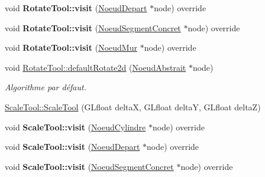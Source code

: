 \begin{DoxyCompactItemize}
\item 
\hypertarget{group__inf2990_ga9649bf652069731e900bb850bd3f8475}{}void {\bfseries Rotate\+Tool\+::visit} (\hyperlink{class_noeud_depart}{Noeud\+Depart} $\ast$node) override\label{group__inf2990_ga9649bf652069731e900bb850bd3f8475}

\item 
\hypertarget{group__inf2990_ga6a6b02897bd7b72119e7a4463d408d47}{}void {\bfseries Rotate\+Tool\+::visit} (\hyperlink{class_noeud_segment_concret}{Noeud\+Segment\+Concret} $\ast$node) override\label{group__inf2990_ga6a6b02897bd7b72119e7a4463d408d47}

\item 
\hypertarget{group__inf2990_gaa3542aa6a6a3f763a133b4003d30c41f}{}void {\bfseries Rotate\+Tool\+::visit} (\hyperlink{class_noeud_mur}{Noeud\+Mur} $\ast$node) override\label{group__inf2990_gaa3542aa6a6a3f763a133b4003d30c41f}

\item 
\hypertarget{group__inf2990_ga3d7a6452fd82b9684e5e24ed3aeef6b5}{}void \hyperlink{group__inf2990_ga3d7a6452fd82b9684e5e24ed3aeef6b5}{Rotate\+Tool\+::default\+Rotate2d} (\hyperlink{class_noeud_abstrait}{Noeud\+Abstrait} $\ast$node)\label{group__inf2990_ga3d7a6452fd82b9684e5e24ed3aeef6b5}

\begin{DoxyCompactList}\small\item\em Algorithme par défaut. \end{DoxyCompactList}\item 
\hyperlink{group__inf2990_ga87222e8bea8ff2b71862e5993d1a3669}{Scale\+Tool\+::\+Scale\+Tool} (G\+Lfloat delta\+X, G\+Lfloat delta\+Y, G\+Lfloat delta\+Z)
\item 
\hypertarget{group__inf2990_gab8949c8d5e040c10f62d385129a586f2}{}void {\bfseries Scale\+Tool\+::visit} (\hyperlink{class_noeud_cylindre}{Noeud\+Cylindre} $\ast$node) override\label{group__inf2990_gab8949c8d5e040c10f62d385129a586f2}

\item 
\hypertarget{group__inf2990_ga15d28436292d75172260ec68ae29807c}{}void {\bfseries Scale\+Tool\+::visit} (\hyperlink{class_noeud_depart}{Noeud\+Depart} $\ast$node) override\label{group__inf2990_ga15d28436292d75172260ec68ae29807c}

\item 
\hypertarget{group__inf2990_ga72ea4561dcc66cbdc0a9d52e12c7be90}{}void {\bfseries Scale\+Tool\+::visit} (\hyperlink{class_noeud_segment_concret}{Noeud\+Segment\+Concret} $\ast$node) override\label{group__inf2990_ga72ea4561dcc66cbdc0a9d52e12c7be90}


\end{DoxyCompactItemize}
